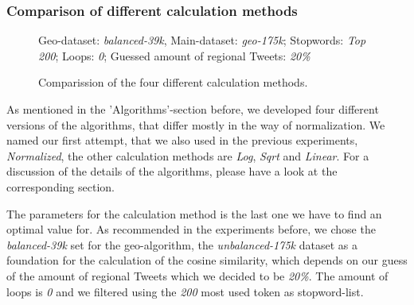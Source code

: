 \documentclass[./Main.tex]{subfiles}
\begin{document}
\subsubsection{Comparison of different calculation methods}
\begin{figure}
\begin{center}
\end{center}

Geo-dataset: \textit{balanced-39k}, Main-dataset: \textit{geo-175k}; Stopwords: \textit{Top 200}; Loops: \textit{0}; Guessed amount of regional Tweets: \textit{20\%}
  \caption{Comparission of the four different calculation methods.}
\label{geo_graph4}
\end{figure}


As mentioned in the 'Algorithms'-section before, we developed four different versions of the algorithms, that differ mostly in the way of normalization. We named our first attempt, that we also used in the previous experiments, \emph{Normalized}, the other calculation methods are \emph{Log}, \emph{Sqrt} and \emph{Linear}. For a discussion of the details of the algorithms, please have a look at the corresponding section. 

The parameters for the calculation method is the last one we have to find an optimal value for. As recommended in the experiments before, we chose the \emph{balanced-39k} set for the geo-algorithm, the \emph{unbalanced-175k} dataset as a foundation for the calculation of the cosine similarity, which depends on our guess of the amount of regional Tweets which we  decided to be \emph{20\%}. The amount of loops is \emph{0} and we filtered using the \emph{200} most used token as stopword-list.
\end{document}
